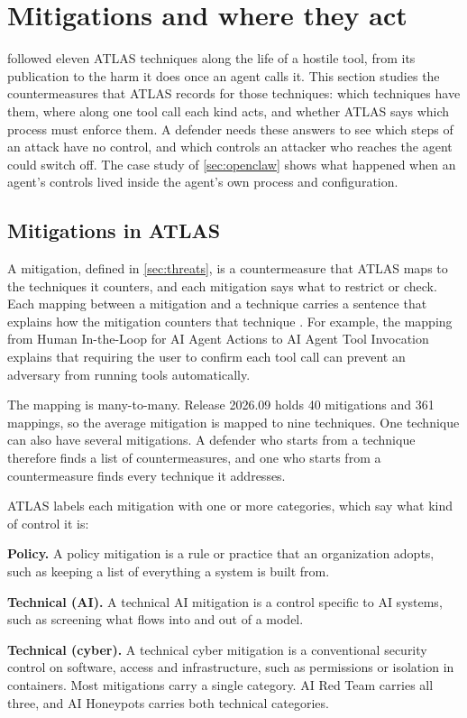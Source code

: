 \section{Mitigations and where they act}
\label{sec:mitigations}

 followed eleven ATLAS techniques along the life of a hostile tool, from its
publication to the harm it does once an agent calls it. This section studies the countermeasures
that ATLAS records for those techniques: which techniques have them, where along one tool call each
kind acts, and whether ATLAS says which process must enforce them. A defender needs these answers
to see which steps of an attack have no control, and which controls an attacker who reaches the
agent could switch off. The case study of \cref{sec:openclaw} shows what happened when an agent's
controls lived inside the agent's own process and configuration.

\subsection{Mitigations in ATLAS}
\label{sec:mitigations-atlas}

A mitigation, defined in \cref{sec:threats}, is a countermeasure that ATLAS maps to the techniques
it counters, and each mitigation says what to restrict or check. Each mapping between a mitigation
and a technique carries a sentence that explains how the mitigation counters that technique
\citep{mitre-atlas-2026}. For example, the mapping from Human In-the-Loop for AI Agent Actions to AI
Agent Tool Invocation explains that requiring the user to confirm each tool call can prevent an
adversary from running tools automatically.

The mapping is many-to-many. Release 2026.09 holds 40 mitigations and 361 mappings, so the average
mitigation is mapped to nine techniques. One technique can also have several mitigations. A
defender who starts from a technique therefore finds a list of countermeasures, and one who starts
from a countermeasure finds every technique it addresses.

ATLAS labels each mitigation with one or more categories, which say what kind of control it is:
\bi
\item \textbf{Policy.} A policy mitigation is a rule or practice that an organization adopts, such
as keeping a list of everything a system is built from.
\item \textbf{Technical (AI).} A technical AI mitigation is a control specific to AI systems, such
as screening what flows into and out of a model.
\item \textbf{Technical (cyber).} A technical cyber mitigation is a conventional security control on
software, access and infrastructure, such as permissions or isolation in containers.
\ei
Most mitigations carry a single category. AI Red Team carries all three, and AI Honeypots carries
both technical categories.

